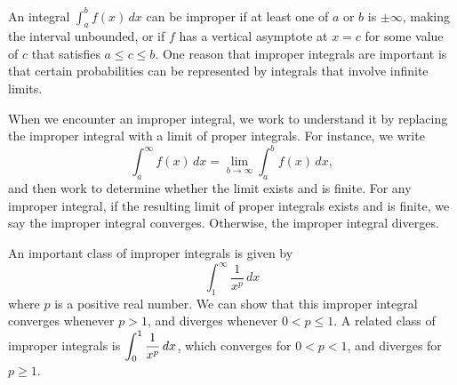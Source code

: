 


\begin{summary}
  \item An integral $\int_a^b f(x) \, dx$ can be improper if at least one of $a$ or $b$ is $\pm \infty$, making the interval unbounded, or if $f$ has a vertical asymptote at $x = c$ for some value of $c$ that satisfies $a \le c \le b$.  One reason that improper integrals are important is that certain probabilities can be represented by integrals that involve infinite limits.
  \item When we encounter an improper integral, we work to understand it by replacing the improper integral with a limit of proper integrals.  For instance, we write $$\int_a^\infty f(x) \, dx = \lim_{b \to \infty} \int_a^b f(x) \, dx,$$
  and then work to determine whether the limit exists and is finite.  For any improper integral, if the resulting limit of proper integrals exists and is finite, we say the improper integral converges.  Otherwise, the improper integral diverges.
  \item An important class of improper integrals is given by
  $$\int_1^{\infty} \frac{1}{x^p} \, dx$$
  where $p$ is a positive real number.  We can show that this improper integral converges whenever $p > 1$, and diverges whenever $0 < p \le 1$.  A related class of improper integrals is $\displaystyle \int_0^1 \frac{1}{x^p} \, dx$, which converges for $0 < p < 1$, and diverges for $p \ge 1$.
\end{summary}

\nin \hrulefill

 

\clearpage
